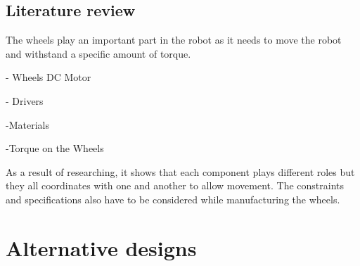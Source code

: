 \documentclass[12pt]{report}
\begin{document}
\section{Literature review} 
The wheels play an important part in the robot as it needs to move the robot and withstand a specific amount of torque. 


- Wheels DC Motor 


- Drivers


-Materials


-Torque on the Wheels


As a result of researching, it shows that each component plays different roles but they all coordinates with one and another to allow movement.
The constraints and specifications also have to be considered while manufacturing the wheels.

\chapter{Alternative designs}
\end{document}
